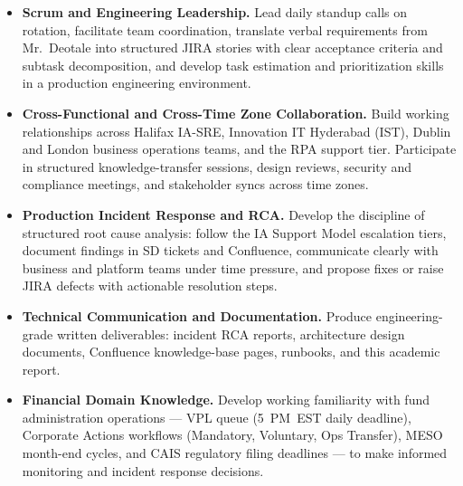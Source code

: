 \begin{itemize}

    \item \textbf{Scrum and Engineering Leadership.}
          Lead daily standup calls on rotation, facilitate team coordination,
          translate verbal requirements from Mr.\ Deotale into structured JIRA
          stories with clear acceptance criteria and subtask decomposition,
          and develop task estimation and prioritization skills in a
          production engineering environment.

    \item \textbf{Cross-Functional and Cross-Time Zone Collaboration.}
          Build working relationships across Halifax IA-SRE, Innovation IT
          Hyderabad (IST), Dublin and London business operations teams,
          and the RPA support tier. Participate in structured
          knowledge-transfer sessions, design reviews, security and
          compliance meetings, and stakeholder syncs across time zones.

    \item \textbf{Production Incident Response and RCA.}
          Develop the discipline of structured root cause analysis: follow
          the IA Support Model escalation tiers, document findings in SD
          tickets and Confluence, communicate clearly with business and
          platform teams under time pressure, and propose fixes or raise
          JIRA defects with actionable resolution steps.

    \item \textbf{Technical Communication and Documentation.}
          Produce engineering-grade written deliverables: incident RCA
          reports, architecture design documents, Confluence knowledge-base
          pages, runbooks, and this academic report.

    \item \textbf{Financial Domain Knowledge.}
          Develop working familiarity with fund administration operations ---
          VPL queue (5~PM~EST daily deadline), Corporate Actions workflows
          (Mandatory, Voluntary, Ops Transfer), MESO month-end cycles,
          and CAIS regulatory filing deadlines --- to make informed
          monitoring and incident response decisions.

\end{itemize}
